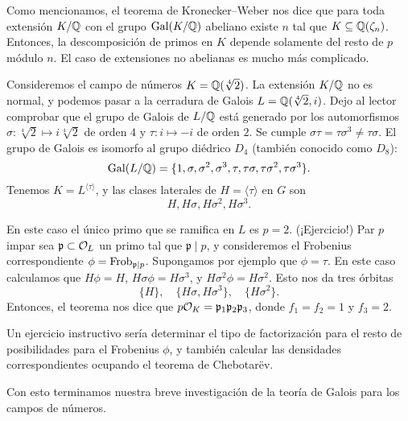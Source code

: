 Como mencionamos, el teorema de Kronecker--Weber nos dice que para toda
extensión $K/\mathbb{Q}$ con el grupo $\operatorname{Gal} (K/\mathbb{Q})$ abeliano existe $n$ tal que
$K \subseteq \mathbb{Q} (\zeta_n)$. Entonces, la descomposición de primos en $K$
depende solamente del resto de $p$ módulo $n$. El caso de extensiones no
abelianas es mucho más complicado.

\begin{ejemplo}
  Consideremos el campo de números $K = \mathbb{Q} (\sqrt[4]{2})$. La extensión $K/\mathbb{Q}$
  no es normal, y podemos pasar a la cerradura de Galois
  $L = \mathbb{Q} (\sqrt[4]{2},i)$. Dejo al lector comprobar que el grupo de Galois de
  $L/\mathbb{Q}$ está generado por los automorfismos
  $\sigma\colon \sqrt[4]{2} \mapsto i\sqrt[4]{2}$ de orden $4$ y
  $\tau\colon i \mapsto -i$ de orden $2$. Se cumple
  $\sigma\tau = \tau\sigma^3 \ne \tau\sigma$. El grupo de Galois es isomorfo al
  grupo diédrico $D_4$ (también conocido como $D_8$):
  \[ \operatorname{Gal} (L/\mathbb{Q}) = \{ 1,\sigma,\sigma^2,\sigma^3,
                       \tau,\tau\sigma,\tau\sigma^2,\tau\sigma^3 \}. \]
  Tenemos $K = L^{\langle\tau\rangle}$, y las clases laterales de
  $H = \langle\tau\rangle$ en $G$ son
  $$H, H\sigma, H\sigma^2, H\sigma^3.$$

  En este caso el único primo que se ramifica en $L$ es $p = 2$. (¡Ejercicio!)
  Par $p$ impar sea $\mathfrak{p} \subset \mathcal{O}_L$ un primo tal que
  $\mathfrak{p}\mid p$, y consideremos el Frobenius correspondiente
  $\phi = \operatorname{Frob}_{\mathfrak{p}|p}$. Supongamos por ejemplo que $\phi = \tau$.
  En este caso calculamos que $H\phi = H$, $H\sigma\phi = H\sigma^3$,
  y $H\sigma^2\phi = H\sigma^2$. Esto nos da tres órbitas
  $$\{ H \}, \quad \{ H\sigma, H\sigma^3 \}, \quad \{ H\sigma^2 \}.$$
  Entonces, el teorema nos dice que
  $p\mathcal{O}_K = \mathfrak{p}_1\mathfrak{p}_2\mathfrak{p}_3$, donde
  $f_1 = f_2 = 1$ y $f_3 = 2$.

  Un ejercicio instructivo sería determinar el tipo de factorización para
  el resto de posibilidades para el Frobenius $\phi$, y también calcular
  las densidades correspondientes ocupando el teorema de Chebotarëv.
\end{ejemplo}

Con esto terminamos nuestra breve investigación de la teoría de Galois para los
campos de números.


\pagebreak


